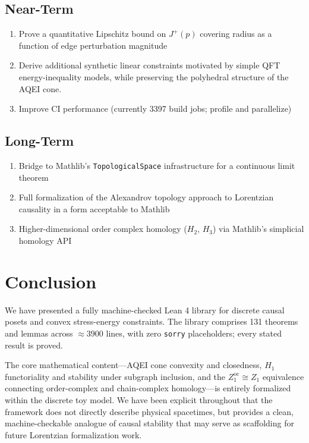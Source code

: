 \documentclass[12pt]{article}
\begin{document}
\subsection{Near-Term}

\begin{enumerate}
    \item Prove a quantitative Lipschitz bound on $J^+(p)$ covering radius as a function of edge perturbation magnitude
    \item Derive additional synthetic linear constraints motivated by simple QFT
          energy-inequality models, while preserving the polyhedral structure of
          the AQEI cone.
    \item Improve CI performance (currently 3397 build jobs; profile and parallelize)
\end{enumerate}

\subsection{Long-Term}

\begin{enumerate}
    \item Bridge to Mathlib's \texttt{TopologicalSpace} infrastructure for a continuous limit theorem
    \item Full formalization of the Alexandrov topology approach to Lorentzian causality in a form acceptable to Mathlib
    \item Higher-dimensional order complex homology ($H_2$, $H_3$) via Mathlib's simplicial homology API
\end{enumerate}

\section{Conclusion}

We have presented a fully machine-checked Lean 4 library for discrete causal posets and convex stress-energy constraints. The library comprises 131 theorems and lemmas across $\approx 3900$ lines, with zero \texttt{sorry} placeholders; every stated result is proved.

The core mathematical content---AQEI cone convexity and closedness, $H_1$ functoriality and stability under subgraph inclusion, and the $Z_1^{\mathrm{oc}} \cong Z_1$ equivalence connecting order-complex and chain-complex homology---is entirely formalized within the discrete toy model. We have been explicit throughout that the framework does not directly describe physical spacetimes, but provides a clean, machine-checkable analogue of causal stability that may serve as scaffolding for future Lorentzian formalization work.
\end{document}
